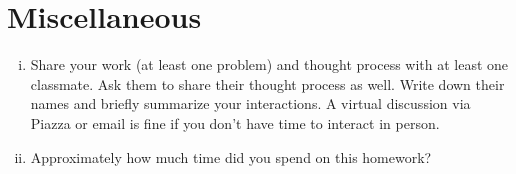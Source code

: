 \documentclass[12pt]{amsart}
\begin{document}
\section{Miscellaneous}
\begin{enumerate}[i.]
    \item Share your work (at least one problem) and thought process with at least one classmate. Ask them to share their thought process as well. Write down their names and briefly summarize your interactions. A virtual discussion via Piazza or email is fine if you don't have time to interact in person. 
    \item Approximately how much time did you spend on this homework?
\end{enumerate}
\end{document}

